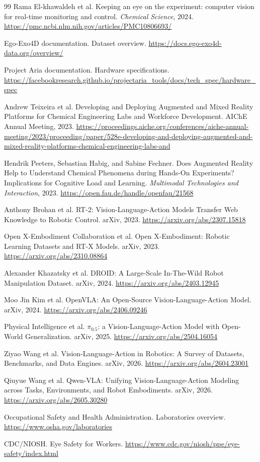 \documentclass[11pt,fontset=none]{ctexart}
\begin{document}
\begin{thebibliography}{99}
Rama El-khawaldeh et al.
Keeping an eye on the experiment: computer vision for real-time monitoring and control.
\emph{Chemical Science}, 2024.
\url{https://pmc.ncbi.nlm.nih.gov/articles/PMC10806693/}

Ego-Exo4D documentation.
Dataset overview.
\url{https://docs.ego-exo4d-data.org/overview/}

Project Aria documentation.
Hardware specifications.
\url{https://facebookresearch.github.io/projectaria_tools/docs/tech_spec/hardware_spec}

Andrew Teixeira et al.
Developing and Deploying Augmented and Mixed Reality Platforms for Chemical Engineering Labs and Workforce Development.
AIChE Annual Meeting, 2023.
\url{https://proceedings.aiche.org/conferences/aiche-annual-meeting/2023/proceeding/paper/528e-developing-and-deploying-augmented-and-mixed-reality-platforms-chemical-engineering-labs-and}

Hendrik Peeters, Sebastian Habig, and Sabine Fechner.
Does Augmented Reality Help to Understand Chemical Phenomena during Hands-On Experiments? Implications for Cognitive Load and Learning.
\emph{Multimodal Technologies and Interaction}, 2023.
\url{https://open.fau.de/handle/openfau/21568}

Anthony Brohan et al.
RT-2: Vision-Language-Action Models Transfer Web Knowledge to Robotic Control.
arXiv, 2023.
\url{https://arxiv.org/abs/2307.15818}

Open X-Embodiment Collaboration et al.
Open X-Embodiment: Robotic Learning Datasets and RT-X Models.
arXiv, 2023.
\url{https://arxiv.org/abs/2310.08864}

Alexander Khazatsky et al.
DROID: A Large-Scale In-The-Wild Robot Manipulation Dataset.
arXiv, 2024.
\url{https://arxiv.org/abs/2403.12945}

Moo Jin Kim et al.
OpenVLA: An Open-Source Vision-Language-Action Model.
arXiv, 2024.
\url{https://arxiv.org/abs/2406.09246}

Physical Intelligence et al.
$\pi_{0.5}$: a Vision-Language-Action Model with Open-World Generalization.
arXiv, 2025.
\url{https://arxiv.org/abs/2504.16054}

Ziyao Wang et al.
Vision-Language-Action in Robotics: A Survey of Datasets, Benchmarks, and Data Engines.
arXiv, 2026.
\url{https://arxiv.org/abs/2604.23001}

Qiuyue Wang et al.
Qwen-VLA: Unifying Vision-Language-Action Modeling across Tasks, Environments, and Robot Embodiments.
arXiv, 2026.
\url{https://arxiv.org/abs/2605.30280}

Occupational Safety and Health Administration.
Laboratories overview.
\url{https://www.osha.gov/laboratories}

CDC/NIOSH.
Eye Safety for Workers.
\url{https://www.cdc.gov/niosh/ppe/eye-safety/index.html}

\end{thebibliography}
\end{document}
